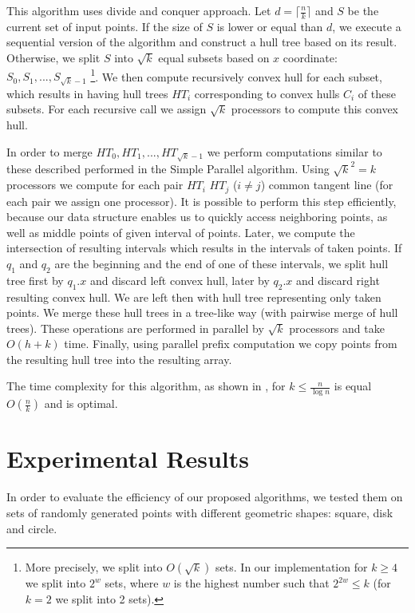 \documentclass[letterpaper]{article}
\theoremstyle{definition}
\begin{document}
This algorithm uses divide and conquer approach. 
Let $d = \lceil\frac{n}{k}\rceil$ and $S$ be the current set of input points.
If the size of $S$ is lower or equal than $d$, we execute a sequential version of the algorithm and construct a hull tree based on its result.
Otherwise, we split $S$ into $\sqrt{k}$
equal subsets based on $x$ coordinate: $S_0, S_1, ..., S_{\sqrt{k} - 1}$
\footnote{More precisely, we split into $O(\sqrt k)$ sets. In our implementation for $k \geq 4$ we split into $2^w$ sets, where $w$ is the highest number such that $2^{2w} \leq k$ (for $k = 2$ we split into 2 sets).}.
We then compute recursively convex hull for each subset, which results in having hull trees $HT_i$ corresponding to convex hulls $C_i$ of these subsets.
For each recursive call we assign $\sqrt{k}$ processors to compute this convex hull.

In order to merge $HT_0, HT_1, ..., HT_{\sqrt{k} - 1}$ we perform computations similar to these described performed in the Simple Parallel algorithm.
Using $\sqrt{k}^2 = k$ processors we compute for each pair $HT_i$ $HT_j$ ($i \neq j$) common tangent line (for each pair we assign one processor).
It is possible to perform this step efficiently, because our data structure enables us to quickly access neighboring points, as well as middle points of given interval of points.
Later, we compute the intersection of resulting intervals which results in the intervals of taken points.
If $q_1$ and $q_2$ are the beginning and the end of one of these intervals, we split hull tree first by $q_1.x$ and discard left convex hull, later by $q_2.x$ and discard right resulting convex hull.
We are left then with hull tree representing only taken points.
We merge these hull trees in a tree-like way (with pairwise merge of hull trees).
These operations are performed in parallel by $\sqrt{k}$ processors and take $O(h + k)$ time.
Finally, using parallel prefix computation we copy points from the resulting hull tree into the resulting array.

The time complexity for this algorithm, as shown in \cite{HullTree}, for $k \leq \frac{n}{\log n}$ is equal $O(\frac{n}{k})$ and is optimal.

\section{Experimental Results}\label{sec:exp}
In order to evaluate the efficiency of our proposed algorithms, we tested them on sets of randomly generated points with different geometric shapes: square, disk and circle.
\end{document}
